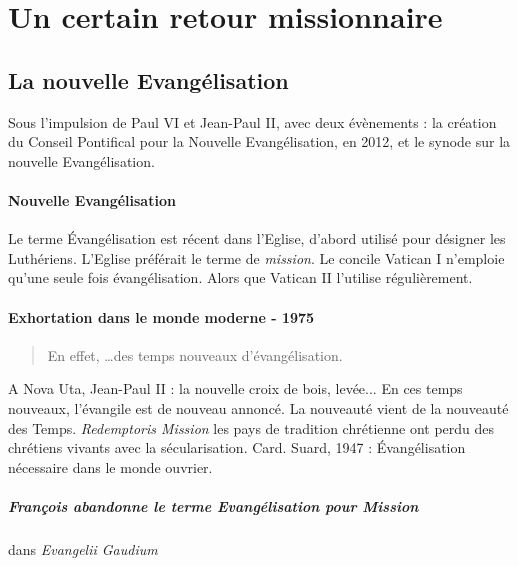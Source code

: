 \section{Un certain retour missionnaire}

\subsection{La nouvelle Evangélisation} 
Sous l'impulsion de Paul VI et Jean-Paul II, avec deux évènements : la création du Conseil Pontifical pour la Nouvelle Evangélisation, en 2012, et le synode sur la nouvelle Evangélisation.

\paragraph{Nouvelle Evangélisation} Le terme Évangélisation est récent dans l'Eglise, d'abord utilisé pour désigner les Luthériens. L'Eglise préférait le terme de \textit{mission}. Le concile Vatican I n'emploie qu'une seule fois évangélisation. Alors que Vatican II l'utilise régulièrement.

\paragraph{Exhortation dans le monde moderne - 1975} 
\begin{quote}
En effet, \ldots des temps nouveaux d'évangélisation.
\end{quote}

A Nova Uta, Jean-Paul II : la nouvelle croix de bois, levée... En ces temps nouveaux, l'évangile est de nouveau annoncé. La nouveauté vient de la nouveauté des Temps.
\textit{Redemptoris Mission} les pays de tradition chrétienne ont perdu des chrétiens vivants avec la sécularisation. Card. Suard, 1947 : Évangélisation nécessaire dans le monde ouvrier.


\subparagraph{François abandonne le terme Evangélisation pour Mission} dans \textit{Evangelii Gaudium}

